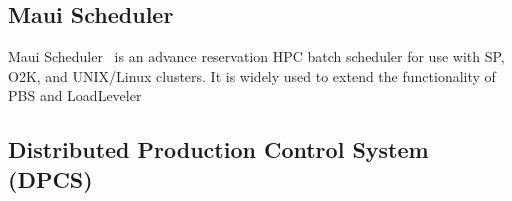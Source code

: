 %
%

\subsection*{Maui Scheduler}

Maui Scheduler~\cite{Maui}
is an advance reservation HPC batch scheduler for use with SP, 
O2K, and UNIX/Linux clusters. It is widely used to extend the 
functionality of PBS and LoadLeveler

\subsection*{Distributed Production Control System (DPCS)}

